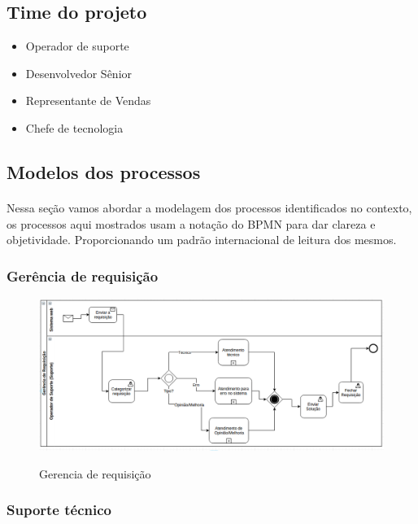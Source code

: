 \documentclass[11pt,a4paper]{article}
\begin{document}
\subsection{Time do projeto}
\begin{itemize}[noitemsep]
  \item Operador de suporte
  \item Desenvolvedor Sênior
  \item Representante de Vendas
  \item Chefe de tecnologia
\end{itemize}




\subsection{Modelos dos processos}
\paragraph{}
Nessa seção vamos abordar a modelagem dos processos identificados no contexto,
os processos aqui mostrados usam a notação do BPMN para dar clareza e objetividade.
Proporcionando um padrão internacional de leitura dos mesmos.


\subsubsection{Gerência de requisição}
\begin{figure}[h]
\caption{Gerencia de requisição}
\centering %
\includegraphics[width=15cm]{as-is/01_gerencia_de_requisicao.png} %
\label{figura:gerencia_requisicao_as_is}
\end{figure}


\subsubsection{Suporte técnico}
\end{document}
